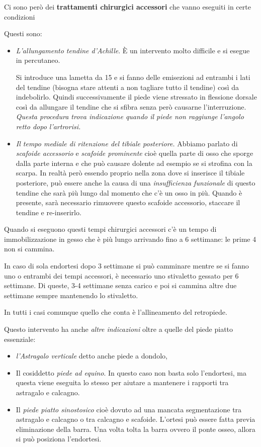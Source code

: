 Ci sono però dei \textbf{trattamenti chirurgici accessori} che vanno eseguiti in certe condizioni

Questi sono:

\begin{itemize}
\item
  \emph{L'allungamento tendine d'Achille}. È un intervento molto difficile e si esegue in percutaneo.

Si introduce una lametta da 15 e si fanno delle emisezioni ad entrambi i lati del tendine (bisogna stare attenti a non tagliare tutto il tendine) così da indebolirlo. Quindi successivamente il piede viene stressato in flessione dorsale così da allungare il tendine che si sfibra senza però causarne l'interruzione. \emph{Questa procedura trova indicazione quando il piede non raggiunge l'angolo retto dopo l'artrorisi.}

\item
  \emph{Il tempo mediale di ritenzione del tibiale posteriore.} Abbiamo parlato di \emph{scafoide accessorio} e \emph{scafoide prominente} cioè quella parte di osso che sporge dalla parte interna e che può causare dolente ad esempio se si strofina con la scarpa. In realtà però essendo proprio nella zona dove si inserisce il tibiale posteriore, può essere anche la causa di una \emph{insufficienza funzionale} di questo tendine che sarà più lungo dal momento che c'è un osso in più. Quando è presente, sarà necessario rimuovere questo scafoide accessorio, staccare il tendine e re-inserirlo.
\end{itemize}

Quando si eseguono questi tempi chirurgici accessori c'è un tempo di immobilizzazione in gesso che è più lungo arrivando fino a 6 settimane: le prime 4 non si cammina.

In caso di sola endortesi dopo 3 settimane si può camminare mentre se si fanno uno o entrambi dei tempi accessori, è necessario uno stivaletto gessato per 6 settimane. Di queste, 3-4 settimane senza carico e poi si cammina altre due settimane sempre mantenendo lo stivaletto.

In tutti i casi comunque quello che conta è l'allineamento del retropiede.

Questo intervento ha anche \emph{altre indicazioni} oltre a quelle del piede piatto essenziale:
\begin{itemize}
\item \emph{l'Astragalo verticale} detto anche piede a dondolo,
\item Il cosiddetto \emph{piede ad equino}. In questo caso non basta solo l'endortesi, ma questa viene eseguita lo stesso per aiutare a mantenere i rapporti tra astragalo e calcagno.
\item Il \emph{piede piatto sinostosico} cioè dovuto ad una mancata segmentazione tra astragalo e calcagno o tra calcagno e scafoide.
L'ortesi può essere fatta previa eliminazione della barra. Una volta tolta la barra ovvero il ponte osseo, allora si può posiziona l'endortesi.
\end{itemize}

